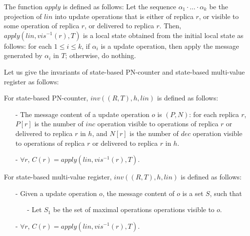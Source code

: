 The function $\mathit{apply}$ is defined as follows: Let the sequence $\alpha_1 \cdot \ldots \cdot \alpha_k$ be the projection of $\mathit{lin}$ into update operations that is either of replica $r$, or visible to some operation of replica $r$, or delivered to replica $r$. Then, $\mathit{apply}(\mathit{lin},\mathit{vis}^{-1}(r),T)$ is a local state obtained from the initial local state as follows: for each $1 \leq i \leq k$, if $\alpha_i$ is a update operation, then apply the message generated by $\alpha_i$ in $T$; otherwise, do nothing. 

Let us give the invariants of state-based PN-counter and state-based multi-value register as follows:  

\begin{example}
\label{example:correctness of state-based PN-counter} 

For state-based PN-counter, $\mathit{inv}((R, T), h, \mathit{lin})$ is defined as follows: 

\begin{itemize}
\setlength{\itemsep}{0.5pt}
\item[-] The message content of a update operation $o$ is $(P,N)$: for each replica $r$, $P[r]$ is the number of $\mathit{inc}$ operation visible to operations of replica $r$ or delivered to replica $r$ in $h$, and $N[r]$ is the number of $\mathit{dec}$ operation visible to operations of replica $r$ or delivered to replica $r$ in $h$.

\item[-] $\forall r$, $C(r) = \mathit{apply}(\mathit{lin},\mathit{vis}^{-1}(r),T)$. 
\end{itemize} 
\end{example} 

\begin{example}
\label{example:correctness of state-based multi-value register}

For state-based multi-value register, $\mathit{inv}((R, T), h, \mathit{lin})$ is defined as follows:

\begin{itemize}
\setlength{\itemsep}{0.5pt}
\item[-] Given a update operation $o$, the message content of $o$ is a set $S$, such that 

    \begin{itemize}
    \setlength{\itemsep}{0.5pt}
    \item[-] Let $S_1$ be the set of maximal operations operations visible to $o$.  
    \end{itemize}

\item[-] $\forall r$, $C(r) = \mathit{apply}(\mathit{lin},\mathit{vis}^{-1}(r),T)$.
\end{itemize}
\end{example} 




